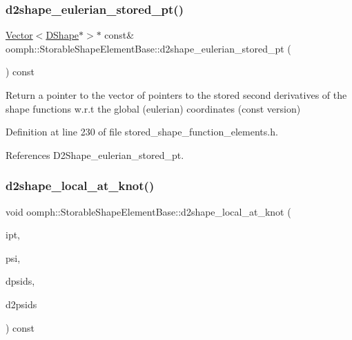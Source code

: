 \subsubsection{\texorpdfstring{d2shape\+\_\+eulerian\+\_\+stored\+\_\+pt()}{d2shape\_eulerian\_stored\_pt()}\hspace{0.1cm}{\footnotesize\ttfamily [2/2]}}
{\footnotesize\ttfamily \hyperlink{classoomph_1_1Vector}{Vector}$<$\hyperlink{classoomph_1_1DShape}{D\+Shape}$\ast$$>$$\ast$ const\& oomph\+::\+Storable\+Shape\+Element\+Base\+::d2shape\+\_\+eulerian\+\_\+stored\+\_\+pt (\begin{DoxyParamCaption}{ }\end{DoxyParamCaption}) const\hspace{0.3cm}{\ttfamily [inline]}}



Return a pointer to the vector of pointers to the stored second derivatives of the shape functions w.\+r.\+t the global (eulerian) coordinates (const version) 



Definition at line 230 of file stored\+\_\+shape\+\_\+function\+\_\+elements.\+h.



References D2\+Shape\+\_\+eulerian\+\_\+stored\+\_\+pt.

\mbox{\label{classoomph_1_1StorableShapeElementBase_af1b0ce3644efb101953a6dc2ce120a3e}} 
\subsubsection{\texorpdfstring{d2shape\+\_\+local\+\_\+at\+\_\+knot()}{d2shape\_local\_at\_knot()}}
{\footnotesize\ttfamily void oomph\+::\+Storable\+Shape\+Element\+Base\+::d2shape\+\_\+local\+\_\+at\+\_\+knot (\begin{DoxyParamCaption}\item[{const unsigned \&}]{ipt,  }\item[{\hyperlink{classoomph_1_1Shape}{Shape} \&}]{psi,  }\item[{\hyperlink{classoomph_1_1DShape}{D\+Shape} \&}]{dpsids,  }\item[{\hyperlink{classoomph_1_1DShape}{D\+Shape} \&}]{d2psids }\end{DoxyParamCaption}) const\hspace{0.3cm}{\ttfamily [virtual]}}



